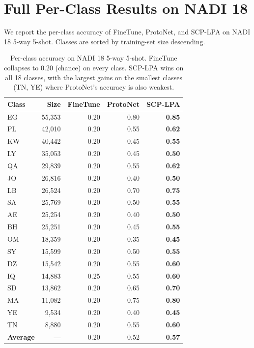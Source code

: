 \documentclass[11pt,a4paper]{article}
\begin{document}
\section{Full Per-Class Results on NADI 18}
\label{app:perclass}

We report the per-class accuracy of FineTune, ProtoNet, and SCP-LPA
on NADI 18 5-way 5-shot. Classes are sorted by training-set size
descending.

\begin{table}[h]
\centering\small
\begin{tabular}{lrrrr}
\toprule
Class & Size & FineTune & ProtoNet & SCP-LPA \\
\midrule
EG  & 55{,}353 & 0.20 & 0.80 & \textbf{0.85} \\
PL  & 42{,}010 & 0.20 & 0.55 & \textbf{0.62} \\
KW  & 40{,}442 & 0.20 & 0.45 & \textbf{0.55} \\
LY  & 35{,}053 & 0.20 & 0.45 & \textbf{0.50} \\
QA  & 29{,}839 & 0.20 & 0.55 & \textbf{0.62} \\
JO  & 26{,}816 & 0.20 & 0.40 & \textbf{0.50} \\
LB  & 26{,}524 & 0.20 & 0.70 & \textbf{0.75} \\
SA  & 25{,}769 & 0.20 & 0.50 & \textbf{0.55} \\
AE  & 25{,}254 & 0.20 & 0.40 & \textbf{0.50} \\
BH  & 25{,}251 & 0.20 & 0.45 & \textbf{0.55} \\
OM  & 18{,}359 & 0.20 & 0.35 & \textbf{0.45} \\
SY  & 15{,}599 & 0.20 & 0.50 & \textbf{0.55} \\
DZ  & 15{,}542 & 0.20 & 0.55 & \textbf{0.60} \\
IQ  & 14{,}883 & 0.25 & 0.55 & \textbf{0.60} \\
SD  & 13{,}862 & 0.20 & 0.65 & \textbf{0.70} \\
MA  & 11{,}082 & 0.20 & 0.75 & \textbf{0.80} \\
YE  & 9{,}534 & 0.20 & 0.40 & \textbf{0.45} \\
TN  & 8{,}880 & 0.20 & 0.55 & \textbf{0.60} \\
\midrule
\textbf{Average} & --- & 0.20 & 0.52 & \textbf{0.57} \\
\bottomrule
\end{tabular}
\caption{Per-class accuracy on NADI 18 5-way 5-shot. FineTune
collapses to 0.20 (chance) on every class. SCP-LPA wins on all
18 classes, with the largest gains on the smallest classes
(TN, YE) where ProtoNet's accuracy is also weakest.}
\label{tab:perclass}
\end{table}
\end{document}
